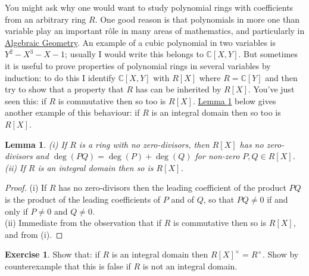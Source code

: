 \documentclass[11pt]{amsbook}
\newtheorem{lemma}[theorem]{Lemma}
\theoremstyle{definition}
\newtheorem{exercise}{Exercise}
\begin{document}
You might ask why one would want to study polynomial rings with coefficients from an arbitrary ring $R$. One good reason is that polynomials in more one than variable play an important r\^ole in many areas of mathematics, and particularly in \href{http://www.drps.ed.ac.uk/14-15/dpt/cxmath11120.htm}{Algebraic Geometry}.  An example of a cubic polynomial in two variables is $Y^2 - X^3 - X - 1$; usually I would write this belongs to $\mathbb{C}[X,Y]$. But sometimes it is useful to prove properties of polynomial rings in several variables by induction: to do this I identify $\mathbb{C}[X,Y]$ with $R[X]$ where $R = \mathbb{C}[Y]$ and then try to show that a property that $R$ has can be inherited by $R[X]$. You've just seen this: if $R$ is commutative then so too is $R[X]$. \hyperref[degadd]{Lemma \ref{degadd}} below gives another example of this behaviour: if $R$ is an integral domain then so too is $R[X]$.

\begin{lemma}
\label{degadd}
(i) If $R$ is a ring with no zero-divisors, then $R[X]$ has no zero-divisors and $\deg (PQ) = \deg(P) + \deg(Q)$ for non-zero $P,Q \in R[X]$.\\
(ii) If $R$ is an integral domain then so is $R[X]$.
\end{lemma}
\begin{proof}
(i) If $R$ has no zero-divisors then the leading coefficient of the product $PQ$ is the product of the leading coefficients of $P$ and of $Q$, so that
$PQ \neq 0$ if and only if $P \neq 0$ and $Q \neq 0$.\\
(ii) Immediate from the observation that if $R$ is commutative then so is $R[X]$, and from (i).
\end{proof}

\begin{exercise} Show that: if $R$ is an integral domain then $R[X]^{\times} = R^{\times}$. Show by counterexample that this is false if $R$ is not an integral domain.
\end{exercise}
\end{document}
